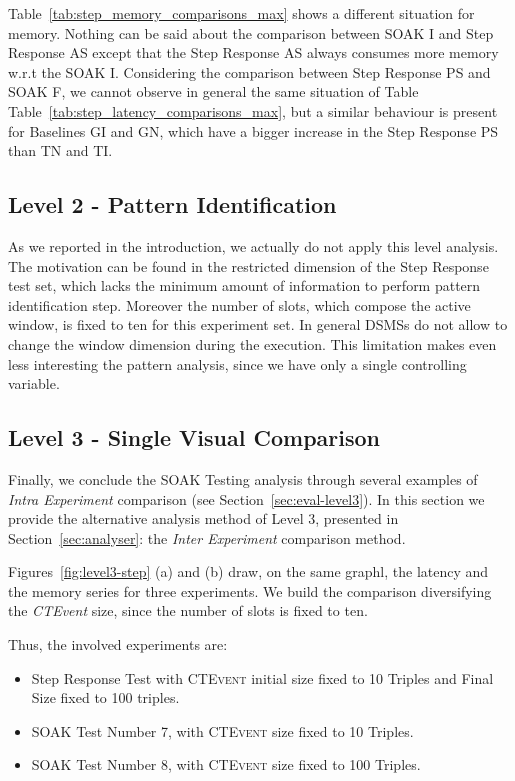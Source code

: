 Table~\ref{tab:step_memory_comparisons_max} shows a different situation for memory. Nothing can be said about the comparison between SOAK I and Step Response AS except that the Step Response AS always consumes more memory w.r.t the SOAK I. Considering the comparison between Step Response PS and SOAK F, we cannot observe in general the same situation of Table Table~\ref{tab:step_latency_comparisons_max}, but a similar behaviour is present for Baselines GI and GN, which have a bigger increase in the Step Response PS than TN and TI.

\subsection{Level 2 - Pattern Identification}\label{sec:level2-step-pattern}

As we reported in the introduction, we actually do not apply this level analysis. The motivation can be found in the restricted dimension of the Step Response test set, which lacks the minimum amount of information to perform pattern identification step. Moreover the number of slots, which compose the active window, is fixed to ten for this experiment set. In general DSMSs do not allow to change the window dimension during the execution. This limitation makes even less interesting the pattern analysis, since we have only a single controlling variable.

\subsection{Level 3 - Single Visual Comparison}\label{sec:level3-step-inter}

Finally, we conclude the SOAK Testing analysis through several examples of \textit{Intra Experiment} comparison (see Section~\ref{sec:eval-level3}). In this section we provide the alternative analysis method of Level 3, presented in Section~\ref{sec:analyser}: the \textit{Inter Experiment} comparison method.

Figures~\ref{fig:level3-step} (a) and (b) draw, on the same graphl, the latency and the memory series for three experiments.  We build the comparison diversifying the \textit{CTEvent} size, since the number of slots is fixed to ten.
\pagebreak

Thus, the involved experiments are:
\begin{itemize}
\item Step Response Test with \textsc{CTEvent} initial size fixed to 10 Triples and Final Size fixed to 100 triples.
\item SOAK Test Number 7, with \textsc{CTEvent} size fixed to 10 Triples.
\item SOAK Test Number 8, with \textsc{CTEvent} size fixed to 100 Triples.
\end{itemize}

